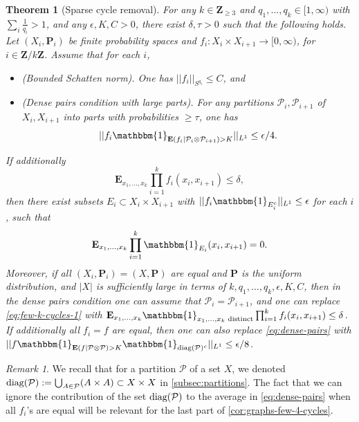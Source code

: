 \documentclass[reqno,11pt]{amsart}
\newtheorem{theorem}{Theorem}[section]
\theoremstyle{definition}
\theoremstyle{remark}
\newtheorem*{remark}{Remark}
\numberwithin{equation}{section}
\newcommand{\Z}{\mathbf{Z}}
\renewcommand{\P}{\mathbf{P}}
\newcommand{\E}{\mathbf{E}}
\newcommand{\mP}{\mathcal{P}}
\newcommand{\one}{\mathbbm{1}}
\newcommand{\diag}{\textnormal{diag}}
\begin{document}
\begin{theorem}[Sparse cycle removal] \label{thm:sparse-k-cycle-removal}
For any $k \in \Z_{\ge 3}$ and $q_1, \ldots, q_k \in [1, \infty)$ with $\sum_i \frac{1}{q_i} > 1$, and any $\epsilon, K, C > 0$, there exist $\delta, \tau > 0$ such that the following holds.
Let $(X_i, \P_i)$ be finite probability spaces and $f_{i} : X_i \times X_{i+1} \to [0, \infty)$, for $i \in \Z/k\Z$. Assume that for each $i$,
\begin{itemize}
    \item[$(i)$] \emph{(Bounded Schatten norm).} One has $||f_{i}||_{S^{q_i}} \le C$, and
    \item[$(ii)$] \emph{(Dense pairs condition with large parts).} For any partitions $\mP_i, \mP_{i+1}$ of $X_i, X_{i+1}$ into parts with probabilities $\ge \tau$, one has
    \begin{equation} \label{eq:dense-pairs}
        ||f_{i}\one_{\E(f_{i} \mid \mP_i \otimes \mP_{i+1}) > K} ||_{L^1} \le \epsilon/4.
    \end{equation}
\end{itemize}
If additionally
\begin{equation} \label{eq:few-k-cycles-1}
    \E_{x_1, \ldots, x_k} \prod_{i=1}^k f_{i}(x_i,x_{i+1}) \le \delta,
\end{equation}
then there exist subsets $E_{i} \subset X_i \times X_{i+1}$ with $||f_{i} \one_{E_{i}^c}||_{L^1} \le \epsilon$ for each $i$, such that
\[
    \E_{x_1, \ldots, x_k} \prod_{i=1}^k \one_{E_{i}}(x_i,x_{i+1}) = 0.
\]
Moreover, if all $(X_i, \P_i) = (X, \P)$ are equal and $\P$ is the uniform distribution, and $|X|$ is sufficiently large in terms of $k,q_1,\ldots,q_k,\epsilon,K,C$, then in the dense pairs condition one can assume that $\mP_i = \mP_{i+1}$, and one can replace \cref{eq:few-k-cycles-1} with $\E_{x_1, \ldots, x_k}\one_{x_1,\ldots,x_k\textnormal{ distinct}} \prod_{i=1}^k f_{i}(x_i,x_{i+1})  \le \delta$. If additionally all $f_i = f$ are equal, then one can also replace \cref{eq:dense-pairs} with $||f\one_{\E(f \mid \mP \otimes \mP) > K} \one_{\diag(\mP)^c}||_{L^1} \le \epsilon/8$.
\end{theorem}


\begin{remark}
We recall that for a partition $\mP$ of a set $X$, we denoted $\diag(\mP) := \bigcup_{A \in \mP} (A \times A) \subset X \times X$ in \cref{subsec:partitions}. The fact that we can ignore the contribution of the set $\diag(\mP)$ to the average in \cref{eq:dense-pairs} when all $f_i$'s are equal will be relevant for the last part of \cref{cor:graphs-few-4-cycles}.
\end{remark}
\end{document}
